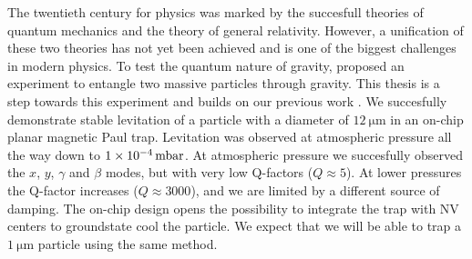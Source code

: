 The twentieth century for physics was marked by the succesfull theories of quantum mechanics and the theory of general relativity. However, a unification of these two theories has not yet been achieved and is one of the biggest challenges in modern physics. To test the quantum nature of gravity, \citeauthor{bose_spin_2017} proposed an experiment to entangle two massive particles through gravity\cite{bose_spin_2017}. This thesis is a step towards this experiment and builds on our previous work \cite{janse_characterization_2024,eli,mart}. We succesfully demonstrate stable levitation of a  particle with a diameter of $\qty{12}{\micro\meter}$ in an on-chip planar magnetic Paul trap. Levitation was observed at atmospheric pressure all the way down to $\qty{1E-4}{\milli\bar}$. At atmospheric pressure we succesfully observed the $x$, $y$, $\gamma$ and $\beta$ modes, but with very low Q-factors ($Q \approx 5$). At lower pressures the Q-factor increases ($Q \approx 3000$), and we are limited by a different source of damping. The on-chip design opens the possibility to integrate the trap with NV centers to groundstate cool the particle. We expect that we will be able to trap a $\qty{1}{\micro\meter}$ particle using the same method.

